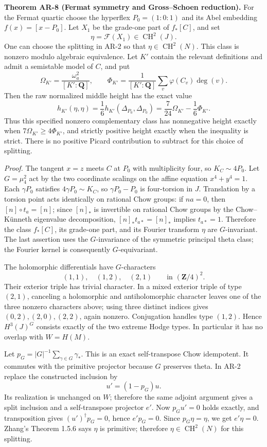 \documentclass[11pt,a4paper]{article}
\begin{document}
\textbf{Theorem AR-8 (Fermat symmetry and Gross--Schoen reduction).} For
the Fermat quartic choose the hyperflex \(P_0=(1:0:1)\) and its Abel
embedding \(f(x)=[x-P_0]\). Let \(X_1\) be the grade-one part of
\(f_*[C]\), and set \[
\eta=\mathcal F(X_1)\in\operatorname{CH}^2(J).
\] One can choose the splitting in AR-2 so that
\(\eta\in\operatorname{CH}^2(N)\). This class is nonzero modulo
algebraic equivalence. Let \(K'\) contain the relevant definitions and
admit a semistable model of \(C\), and put \[
\Omega_{K'}=\frac{\omega_a^2}{[K':\mathbf Q]},
\qquad
\Phi_{K'}=\frac{1}{[K':\mathbf Q]}
 \sum_v\varphi(C_v)\deg(v).
\] Then the raw normalized middle height has the exact value \[
h_{K'}(\eta,\eta)
 =\frac16 h_{K'}(\Delta_{P_0},\Delta_{P_0})
 =\frac7{24}\Omega_{K'}-\frac16\Phi_{K'}.
\tag{AR.10}
\] Thus this specified nonzero complementary class has nonnegative
height exactly when \(7\Omega_{K'}\ge4\Phi_{K'}\), and strictly positive
height exactly when the inequality is strict. There is no positive
Picard contribution to subtract for this choice of splitting.

\emph{Proof.} The tangent \(x=z\) meets \(C\) at \(P_0\) with
multiplicity four, so \(K_C\sim4P_0\). Let \(G=\mu_4^2\) act by the two
coordinate scalings on the affine equation \(x^4+y^4=1\). Each
\(\gamma P_0\) satisfies \(4\gamma P_0\sim K_C\), so \(\gamma P_0-P_0\)
is four-torsion in \(J\). Translation by a torsion point acts
identically on rational Chow groups: if \(na=0\), then
\([n]\circ t_a=[n]\); since \([n]_*\) is invertible on rational Chow
groups by the Chow--Künneth eigenvalue decomposition,
\([n]_*t_{a*}=[n]_*\) implies \(t_{a*}=1\). Therefore the class
\(f_*[C]\), its grade-one part, and its Fourier transform \(\eta\) are
\(G\)-invariant. The last assertion uses the \(G\)-invariance of the
symmetric principal theta class; the Fourier kernel is consequently
\(G\)-equivariant.

The holomorphic differentials have \(G\)-characters \[
(1,1),\quad(1,2),\quad(2,1)\qquad\text{in }(\mathbf Z/4)^2.
\] Their exterior triple has trivial character. In a mixed exterior
triple of type \((2,1)\), canceling a holomorphic and antiholomorphic
character leaves one of the three nonzero characters above; using three
distinct indices gives \((0,2),(2,0),(2,2)\), again nonzero. Conjugation
handles type \((1,2)\). Hence \(H^3(J)^G\) consists exactly of the two
extreme Hodge types. In particular it has no overlap with \(W=H(M)\).

Let \(p_G=|G|^{-1}\sum_{\gamma\in G}\gamma_*\). This is an exact
self-transpose Chow idempotent. It commutes with the primitive projector
because \(G\) preserves theta. In AR-2 replace the constructed inclusion
by \[
u'=(1-p_G)u.
\] Its realization is unchanged on \(W\); therefore the same adjoint
argument gives a split inclusion and a self-transpose projector \(e'\).
Now \(p_Gu'=0\) holds exactly, and transposition gives
\((u')^\dagger p_G=0\), hence \(e'p_G=0\). Since \(p_G\eta=\eta\), we
get \(e'\eta=0\). Zhang's Theorem 1.5.6 says \(\eta\) is primitive;
therefore \(\eta\in\operatorname{CH}^2(N)\) for this splitting.
\end{document}
